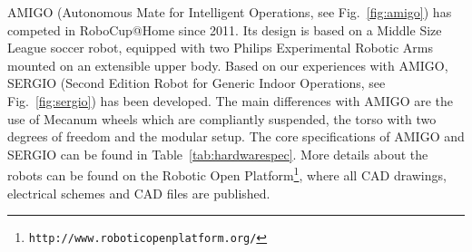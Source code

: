 AMIGO (Autonomous Mate for Intelligent Operations, see Fig.~\ref{fig:amigo}) has competed in RoboCup@Home since 2011. Its design is based on a Middle Size League soccer robot, equipped with two Philips Experimental Robotic Arms mounted on an extensible upper body. Based on our experiences with AMIGO, SERGIO (Second Edition Robot for Generic Indoor Operations, see Fig.~\ref{fig:sergio}) has been developed. The main differences with AMIGO are the use of Mecanum wheels which are compliantly suspended, the torso with two degrees of freedom and the modular setup. The core specifications of AMIGO and SERGIO can be found in Table~\ref{tab:hardwarespec}. More details about the robots can be found on the Robotic Open Platform\footnote{\texttt{http://www.roboticopenplatform.org/}}, where all CAD drawings, electrical schemes and CAD files are published.

